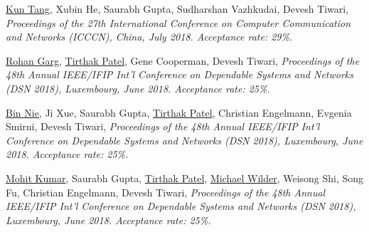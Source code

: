 {\textnormal{\newline \underline{Kun Tang}, Xubin He, Saurabh Gupta, Sudharshan Vazhkudai, Devesh Tiwari,}} {\textit{Proceedings of the 27th International Conference on Computer Communication and Networks (ICCCN), China, July 2018. Acceptance rate: 29\%.\newline}}{}{}{} %

{\textnormal{\newline \underline{Rohan Garg}, \underline{Tirthak Patel}, Gene Cooperman, Devesh Tiwari,}} {\textit{Proceedings of the 48th Annual IEEE/IFIP Int’l Conference on Dependable Systems and Networks (DSN 2018), Luxembourg, June 2018. Acceptance rate: 25\%.\newline}}{}{}{} %

 {\textnormal{\newline \underline{Bin Nie}, Ji Xue, Saurabh Gupta, \underline{Tirthak Patel}, Christian Engelmann, Evgenia Smirni, Devesh Tiwari,}} {\textit{Proceedings of the 48th Annual IEEE/IFIP Int’l Conference on Dependable Systems and Networks (DSN 2018), Luxembourg, June 2018. Acceptance rate: 25\%.\newline}}{}{}{} %

 {\textnormal{\newline \underline{Mohit Kumar}, Saurabh Gupta, \underline{Tirthak Patel}, \underline{Michael Wilder}, Weisong Shi, Song Fu, Christian Engelmann, Devesh Tiwari,}} {\textit{Proceedings of the 48th Annual IEEE/IFIP Int’l Conference on Dependable Systems and Networks (DSN 2018), Luxembourg, June 2018. Acceptance rate: 25\%.\newline}}{}{}{} %

